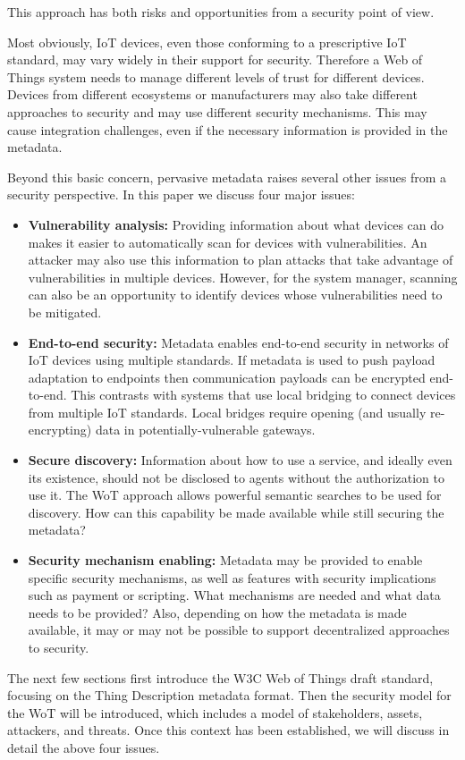This approach has both risks and opportunities from a security point of view.

Most obviously, IoT devices, even those conforming to a prescriptive IoT standard,
may vary widely in their support for security.
Therefore a Web of Things system
needs to manage different levels of trust for different devices.
Devices from different ecosystems or manufacturers may also take different approaches to
security and may use different security mechanisms. 
This may cause integration challenges, even if the necessary
information is provided in the metadata.

Beyond this basic concern, pervasive metadata raises several other issues
from a security perspective.
In this paper we discuss four major issues:
\begin{itemize}
\item \textbf{Vulnerability analysis:}
Providing information about what devices can do makes it easier to 
automatically scan for devices with vulnerabilities.
An attacker may also use this information to plan attacks that take advantage of 
vulnerabilities in multiple devices. 
However, for the system manager, scanning can also be an opportunity 
to identify devices whose vulnerabilities need to be mitigated.
\item \textbf{End-to-end security:}
Metadata enables end-to-end security in networks of IoT devices using multiple standards.
If metadata is used to push payload adaptation to endpoints then 
communication payloads can be encrypted end-to-end.  
This contrasts with systems that use local bridging to connect devices from multiple IoT standards.
Local bridges require opening (and usually re-encrypting) data in potentially-vulnerable gateways.
\item \textbf{Secure discovery:}
Information about how to use a service, 
and ideally even its existence, should not
be disclosed to agents without the authorization to use it.
The WoT approach allows powerful semantic searches to be used for discovery.
How can this capability be made available while still securing the metadata?
\item \textbf{Security mechanism enabling:}
Metadata may be provided to enable specific security mechanisms,
as well as features with security implications such as payment or scripting.
What mechanisms are needed and what data needs to be provided?
Also, depending on how the metadata is made available, it may or may not be 
possible to support decentralized approaches to security.
\end{itemize}

The next few sections first introduce the W3C Web of Things draft standard,
focusing on the Thing Description metadata format.  
Then the security model for the WoT will be introduced,
which includes a model of stakeholders, assets, attackers, and threats.
Once this context has been established, we will discuss in detail the above
four issues.

